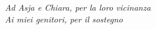 \cleardoublepage
\thispagestyle{empty}
\begin{flushright}
\itshape 
Ad Asja e Chiara, per la loro vicinanza\\
Ai miei genitori, per il sostegno
\end{flushright}
\cleardoublepage